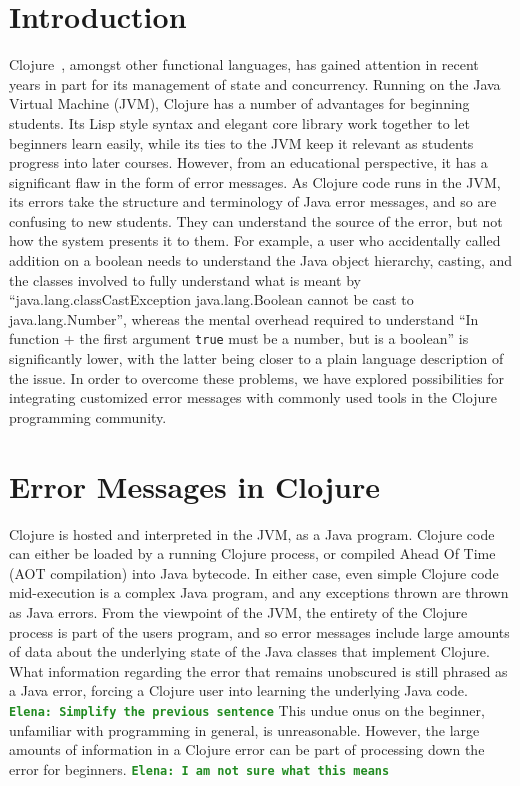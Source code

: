 \documentclass[12pt]{article}
\newcommand{\comment}[1]{{\bf \tt  {#1}}}
\newcommand{\emcomment}[1]{\textcolor{ForestGreen}{\comment{Elena: {#1}}}}
\begin{document}
\newpage
\setcounter{page}{1}

\section{Introduction}
Clojure~\cite{Hickey:2008}, amongst other functional languages, has gained attention in recent years
in part for its management of state and concurrency.
Running on the Java Virtual Machine (JVM), Clojure has a number of advantages for beginning students.
Its Lisp style syntax and elegant core library work together to let beginners learn easily, while
its ties to the JVM keep it relevant as students progress into later courses.
However, from an educational perspective, it has a significant flaw in the form of error messages.
As Clojure code runs in the JVM, its errors take the structure and terminology of Java error messages,
and so are confusing to new students. They can understand the source of the error,
but not how the system presents it to them.
For example, a user who accidentally called addition on a boolean needs
 to understand the Java object hierarchy, casting,
 and the classes involved to fully understand what is meant by
 ``java.lang.classCastException java.lang.Boolean cannot be cast to java.lang.Number'',
whereas the mental overhead required to understand
``In function + the first argument {\tt true} must be a number, but is a boolean''
 is significantly lower, with the latter being closer to a plain language
 description of the issue.
 In order to overcome these problems,
 we have explored possibilities for integrating customized error messages
 with commonly used tools in the Clojure programming community.

\section{Error Messages in Clojure}
Clojure is hosted and interpreted in the JVM, as a Java program.
Clojure code can either be loaded by a running Clojure process, or
compiled Ahead Of Time (AOT compilation) into Java bytecode. In either case,
even simple Clojure code mid-execution is a complex Java program,
and any exceptions thrown are thrown as Java errors.
From the viewpoint of the JVM, the entirety of the Clojure process is
part of the users program, and so error messages include large amounts
of data about the underlying state of the Java classes that implement Clojure.
What information regarding the error that remains unobscured is still
phrased as a Java error, forcing a Clojure user into learning
the underlying Java code. 
\emcomment{Simplify the previous sentence}
This undue onus on the beginner,
unfamiliar with programming in general, is unreasonable.
However, the large amounts of information in a Clojure error
can be part of processing down the error for beginners.
\emcomment{I am not sure what this means}
\end{document}
